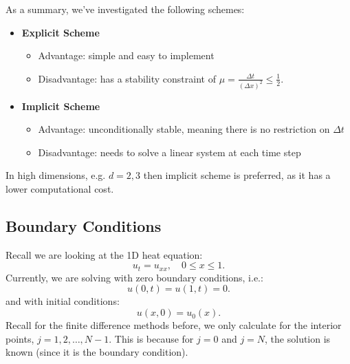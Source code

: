 \documentclass[../main/main.tex]{subfiles}
\begin{document}
As a summary, we've investigated the following schemes:
\begin{itemize}
    \item \textbf{Explicit Scheme} 
        \begin{itemize}
            \item Advantage: simple and easy to implement
            \item Disadvantage: has a stability constraint of $\mu = \frac{\Delta t}{(\Delta x)^2}\le \frac{1}{2}$.
        \end{itemize}

    \item \textbf{Implicit Scheme}
        \begin{itemize}
            \item Advantage: unconditionally stable, meaning there is no restriction on $\Delta t$
            \item Disadvantage: needs to solve a linear system at each time step
        \end{itemize}
\end{itemize}
\begin{remark}
    In high dimensions, e.g. $d = 2,3$ then implicit scheme is preferred, as it has a lower computational cost.
\end{remark}

\subsection{Boundary Conditions}
Recall we are looking at the 1D heat equation: \[
u_t = u_{ x x}, \quad 0 \le  x \le  1
.\] 
Currently, we are solving with zero boundary conditions, i.e.: \[ 
    u(0,t) = u(1,t) = 0
.\] 
and with initial conditions: \[
    u(x,0)= u_0(x)
.\] 
Recall for the finite difference methods before, we only calculate for the interior points, $j=1,2,\ldots,N-1$. This is because for $j=0$ and  $j=N$, the solution is known (since it is the boundary condition). 
\end{document}
